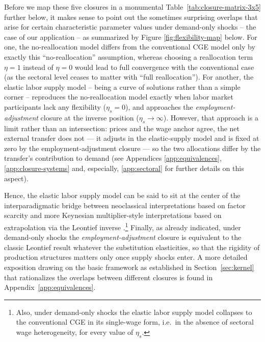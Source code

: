 Before we map these five closures in a monumental Table~\ref{tab:closure-matrix-3x5} further below, it makes sense to point out the sometimes surprising overlaps that arise for certain characteristic parameter values under demand-only shocks -- the case of our application -- as summarized by Figure \ref{fig:flexibility-map} below. For one, the no-reallocation model differs from the conventional CGE model only by exactly this ``no-reallocation'' assumption, whereas choosing a reallocation term $\eta=1$ instead of $\eta=0$ would lead to full convergence with the conventional case (as the sectoral level ceases to matter with ``full reallocation''). For another, the elastic labor supply model -- being a curve of solutions rather than a simple corner -- reproduces the no-reallocation model exactly when labor market participants lack any flexibility ($\eta_s=0$), and approaches the \textit{employment-adjustment} closure at the inverse position ($\eta_s \rightarrow \infty$). However, that approach is a limit rather than an intersection: prices and the
wage anchor agree, the net external transfer does not --- it adjusts in the elastic-supply model and is fixed at zero by the employment-adjustment closure --- so the two allocations differ by the transfer's contribution to demand (see Appendices \ref{app:equivalences}, \ref{app:closure-systems} and, especially, \ref{app:sectoral} for further details on this aspect).

Hence, the elastic labor supply model can be said to sit at the center of the interparadigmatic bridge between neoclassical interpretations based on factor scarcity and more Keynesian multiplier-style interpretations based on extrapolation via the Leontief inverse \citep{Robinson.2006, Taylor1990}.\footnote{Also, under demand-only shocks the elastic labor supply model collapses to the conventional CGE in its single-wage form, i.e.\ in the absence of sectoral wage heterogeneity, for every value of $\eta_s$.} 
Finally, as already indicated, under demand-only shocks the \textit{employment-adjustment} closure is equivalent to the classic Leontief result whatever the substitution elasticities, so that the rigidity of production structures matters only once supply shocks enter. A more detailed exposition drawing on the basic framework as established in Section~\ref{sec:kernel} that rationalizes the overlaps between different closures is found in Appendix~\ref{app:equivalences}.


